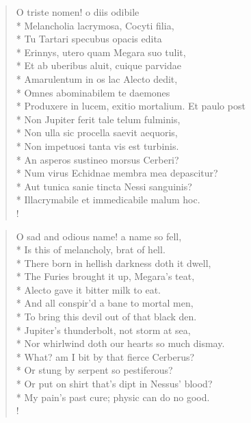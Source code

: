 \begin{latin}
\begin{verse}%
O triste nomen! o diis odibile\\*
Melancholia lacrymosa, Cocyti filia,\\*
Tu Tartari specubus opacis edita\\*
Erinnys, utero quam Megara suo tulit,\\*
Et ab uberibus aluit, cuique parvidae\\*
Amarulentum in os lac Alecto dedit,\\*
Omnes abominabilem te daemones\\*
Produxere in lucem, exitio mortalium. Et paulo post\\*
Non Jupiter ferit tale telum fulminis,\\*
Non ulla sic procella saevit aequoris,\\*
Non impetuosi tanta vis est turbinis.\\*
An asperos sustineo morsus Cerberi?\\*
Num virus Echidnae membra mea depascitur?\\*
Aut tunica sanie tincta Nessi sanguinis?\\*
Illacrymabile et immedicabile malum hoc.\\!
\end{verse}%
\end{latin}
\translationrule%
\begin{verse}%
O sad and odious name! a name so fell,\\*
Is this of melancholy, brat of hell.\\*
There born in hellish darkness doth it dwell,\\*
The Furies brought it up, Megara's teat,\\*
Alecto gave it bitter milk to eat.\\*
And all conspir'd a bane to mortal men,\\*
To bring this devil out of that black den.\\*
Jupiter's thunderbolt, not storm at sea,\\*
Nor whirlwind doth our hearts so much dismay.\\*
What? am I bit by that fierce Cerberus?\\*
Or stung by serpent so pestiferous?\\*
Or put on shirt that's dipt in Nessus' blood?\\*
My pain's past cure; physic can do no good.\\!
\end{verse}%
%

